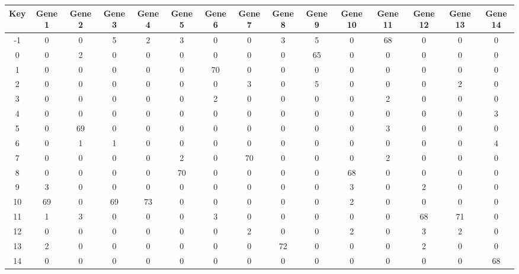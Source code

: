 \begin{tabular}{|c|c|c|c|c|c|c|c|c|c|c|c|c|c|c|}
\hline
Key & Gene 1 & Gene 2 & Gene 3 & Gene 4 & Gene 5 & Gene 6 & Gene 7 & Gene 8 & Gene 9 & Gene 10 & Gene 11 & Gene 12 & Gene 13 & Gene 14 \\
\hline
-1 & 0 & 0 & 5 & 2 & 3 & 0 & 0 & 3 & 5 & 0 & 68 & 0 & 0 & 0 \\
0 & 0 & 2 & 0 & 0 & 0 & 0 & 0 & 0 & 65 & 0 & 0 & 0 & 0 & 0 \\
1 & 0 & 0 & 0 & 0 & 0 & 70 & 0 & 0 & 0 & 0 & 0 & 0 & 0 & 0 \\
2 & 0 & 0 & 0 & 0 & 0 & 0 & 3 & 0 & 5 & 0 & 0 & 0 & 2 & 0 \\
3 & 0 & 0 & 0 & 0 & 0 & 2 & 0 & 0 & 0 & 0 & 2 & 0 & 0 & 0 \\
4 & 0 & 0 & 0 & 0 & 0 & 0 & 0 & 0 & 0 & 0 & 0 & 0 & 0 & 3 \\
5 & 0 & 69 & 0 & 0 & 0 & 0 & 0 & 0 & 0 & 0 & 3 & 0 & 0 & 0 \\
6 & 0 & 1 & 1 & 0 & 0 & 0 & 0 & 0 & 0 & 0 & 0 & 0 & 0 & 4 \\
7 & 0 & 0 & 0 & 0 & 2 & 0 & 70 & 0 & 0 & 0 & 2 & 0 & 0 & 0 \\
8 & 0 & 0 & 0 & 0 & 70 & 0 & 0 & 0 & 0 & 68 & 0 & 0 & 0 & 0 \\
9 & 3 & 0 & 0 & 0 & 0 & 0 & 0 & 0 & 0 & 3 & 0 & 2 & 0 & 0 \\
10 & 69 & 0 & 69 & 73 & 0 & 0 & 0 & 0 & 0 & 2 & 0 & 0 & 0 & 0 \\
11 & 1 & 3 & 0 & 0 & 0 & 3 & 0 & 0 & 0 & 0 & 0 & 68 & 71 & 0 \\
12 & 0 & 0 & 0 & 0 & 0 & 0 & 2 & 0 & 0 & 2 & 0 & 3 & 2 & 0 \\
13 & 2 & 0 & 0 & 0 & 0 & 0 & 0 & 72 & 0 & 0 & 0 & 2 & 0 & 0 \\
14 & 0 & 0 & 0 & 0 & 0 & 0 & 0 & 0 & 0 & 0 & 0 & 0 & 0 & 68 \\
\hline
\end{tabular}